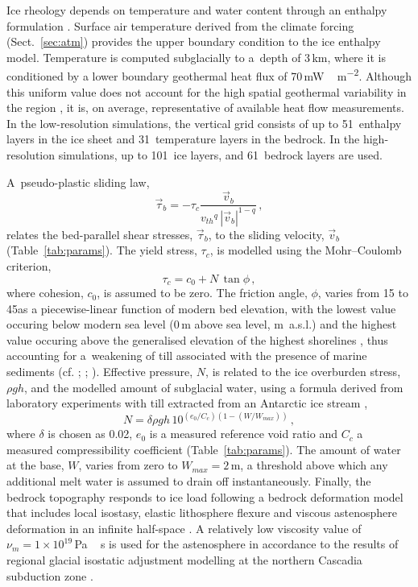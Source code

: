 \documentclass[tc]{copernicus}
\begin{document}
Ice rheology depends on temperature and water content through an enthalpy
formulation \citep{Aschwanden.etal.2012}. Surface air temperature derived from
the climate forcing (Sect.~\ref{sec:atm}) provides the upper boundary
condition to the ice enthalpy model. Temperature is computed subglacially to
a~depth of 3\,km,
where it is conditioned by a lower boundary geothermal heat flux of
70\,\unit{mW\,m^{-2}}. Although this uniform value does not account for the
high spatial geothermal variability in the region
\citep{Blackwell.Richards.2004}, it is, on average, representative of available
heat flow measurements. In the low-resolution simulations, the vertical grid
consists of up to 51~enthalpy layers in the ice sheet and 31~temperature layers
in the bedrock. In the high-resolution simulations, up to 101~ice layers, and
61~bedrock layers are used.

A~pseudo-plastic sliding law,
\begin{equation}
    \label{eqn:pseudoplastic}
    \vec{\tau}_b = -\tau_c \frac{\vec{v}_b}{{v_{th}}^q\,|\vec{v}_b|^{1-q}} \,,
\end{equation}
relates the bed-parallel shear stresses, $\vec{\tau}_b$, to the sliding
velocity, $\vec{v}_b$ (Table~\ref{tab:params}).
The yield stress, $\tau_c$,
is modelled using the Mohr--Coulomb criterion,
\begin{equation}
   \tau_c = c_0 + N\,\tan{\phi} \,,
\end{equation}
where cohesion, $c_0$, is assumed to be zero. The friction angle, $\phi$,
varies from 15 to 45\degree as a piecewise-linear function of modern bed
elevation, with the lowest value occuring below modern sea level (0\,m above
sea level, m~a.s.l.) and the highest value occuring above the generalised
elevation of the highest shorelines
\citep[200\,m~a.s.l.,][Fig.~5]{Clague.1981}, thus accounting for
a~weakening of till associated with the presence of marine sediments
(cf. \citealp{Martin.etal.2011}; \citealp[supplement]{Aschwanden.etal.2013};
\citealp{PISM-authors.2015}). Effective pressure, $N$,
is related to the ice overburden stress, $\rho gh$, and the modelled amount of
subglacial water, using a formula derived from laboratory experiments with till
extracted from an Antarctic ice stream \citep{Tulaczyk.etal.2000,
Bueler.Pelt.2014},
\begin{equation}
    N = \delta \rho gh \, 10^{(e_0/C_c) (1 - (W/W_{max}))} \,,
\end{equation}
where $\delta$ is chosen as 0.02, $e_0$ is a measured reference void ratio and
$C_c$ a measured compressibility coefficient (Table~\ref{tab:params}). The
amount of water at the base, $W$, varies from zero to $W_{max}=2$\,m, a
threshold above which any additional melt water is assumed to drain off
instantaneously. Finally, the bedrock topography responds to ice load
following a bedrock deformation model that includes local isostasy,
elastic lithosphere flexure and viscous astenosphere deformation in an infinite
half-space
\citep[Table~\ref{tab:params};][]{Lingle.Clark.1985,Bueler.etal.2007}.
A relatively low viscosity value of $\nu_m = 1\times10^{19}$\,\unit{Pa\,s} is
used for the astenosphere in accordance to the results of regional glacial
isostatic adjustment modelling at the northern Cascadia subduction zone
\citep{James.etal.2009}.
\end{document}
